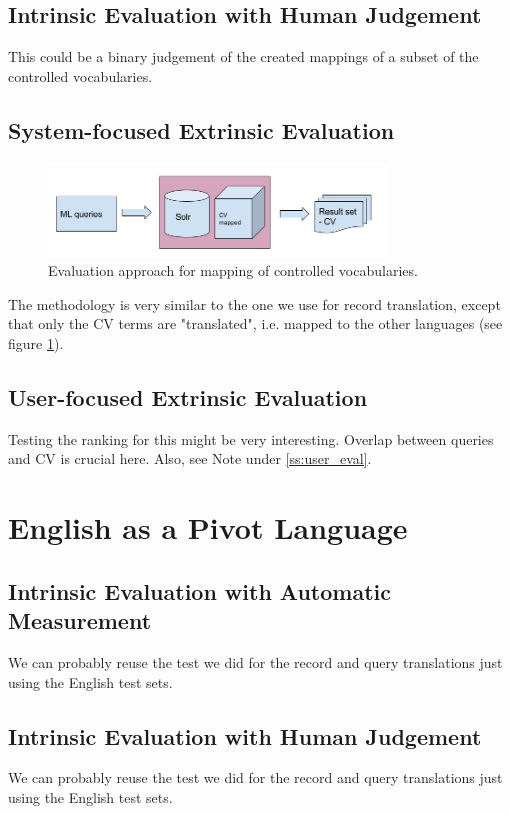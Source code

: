 \documentclass[a4paper,11pt]{article}
\begin{document}
\subsection{Intrinsic Evaluation with Human Judgement}
This could be a binary judgement of the created mappings of a subset of the controlled vocabularies.

\subsection{System-focused Extrinsic Evaluation}

\begin{figure}
	\centering
  \includegraphics[width=0.8\textwidth]{./img/CV-Mapped.png}
	\caption{Evaluation approach for mapping of controlled vocabularies.}
	\label{figsystem}
\end{figure}

The methodology is very similar to the one we use for record translation, except that only the CV terms are "translated", i.e. mapped to the other languages (see figure \ref{figsystem}).


\subsection{User-focused Extrinsic Evaluation}
Testing the ranking for this might be very interesting. Overlap between queries and CV is crucial here. Also, see Note under \ref{ss:user_eval}.

\section{English as a Pivot Language}
\subsection{Intrinsic Evaluation with Automatic Measurement}
We can probably reuse the test we did for the record and query translations just using the English test sets. 
\subsection{Intrinsic Evaluation with Human Judgement}
We can probably reuse the test we did for the record and query translations just using the English test sets. 
\end{document}
